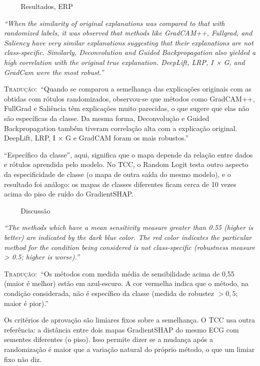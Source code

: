 \documentclass[11pt,a4paper]{article}
\newcommand{\pagechip}[1]{{\setlength{\fboxsep}{1.5pt}\colorbox{cAcc}{\textcolor{white}{\scriptsize\texttt{#1}}}}}
\newenvironment{origquote}{\par\itshape\small}{\par}
\newenvironment{tradquote}{\par\small\textsc{Tradução:}\ }{\par}
\newcommand{\explab}[1]{\par\smallskip{\small\color{cAcc}\textbf{\MakeUppercase{#1}}}\par}
\begin{document}
\begin{citacard}{\pagechip{p. 4} Resultados, ERP}
\begin{origquote}“When the similarity of original explanations was compared to that with randomized labels, it was observed that methods like GradCAM++, Fullgrad, and Saliency have very similar explanations suggesting that their explanations are not class-specific. Similarly, Deconvolution and Guided Backpropagation also yielded a high correlation with the original true explanation. DeepLift, LRP, I × G, and GradCam were the most robust.”\end{origquote}
\begin{tradquote}“Quando se comparou a semelhança das explicações originais com as obtidas com rótulos randomizados, observou-se que métodos como GradCAM++, FullGrad e Saliência têm explicações muito parecidas, o que sugere que elas não são específicas da classe. Da mesma forma, Deconvolução e Guided Backpropagation também tiveram correlação alta com a explicação original. DeepLift, LRP, I $\times$ G e GradCAM foram os mais robustos.”\end{tradquote}
\explab{Explicação}
“Específico da classe”, aqui, significa que o mapa depende da relação entre dados e rótulos aprendida pelo modelo. No TCC, o Random Logit testa outro aspecto da especificidade de classe (o mapa de outra saída do mesmo modelo), e o resultado foi análogo: os mapas de classes diferentes ficam cerca de 10 vezes acima do piso de ruído do GradientSHAP.
\end{citacard}

\begin{citacard}{\pagechip{p. 7} Discussão}
\begin{origquote}“The methods which have a mean sensitivity measure greater than 0.55 (higher is better) are indicated by the dark blue color. The red color indicates the particular method for the condition being considered is not class-specific (robustness measure > 0.5; higher is worse).”\end{origquote}
\begin{tradquote}“Os métodos com medida média de sensibilidade acima de 0,55 (maior é melhor) estão em azul-escuro. A cor vermelha indica que o método, na condição considerada, não é específico da classe (medida de robustez $> 0{,}5$; maior é pior).”\end{tradquote}
\explab{Explicação}
Os critérios de aprovação são limiares fixos sobre a semelhança. O TCC usa outra referência: a distância entre dois mapas GradientSHAP do mesmo ECG com sementes diferentes (o piso). Isso permite dizer se a mudança após a randomização é maior que a variação natural do próprio método, o que um limiar fixo não diz.
\end{citacard}
\end{document}
